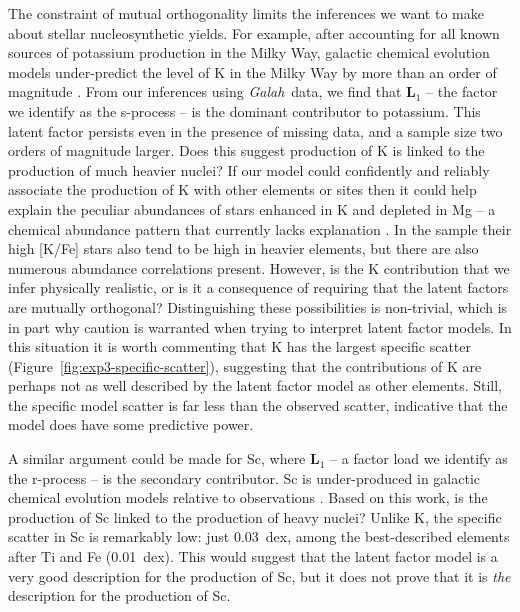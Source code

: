 \documentclass[twocolumn]{aastex62}
\newcommand{\project}[1]{\textsl{#1}}
\newcommand{\Galah}{\project{Galah}}
\newcommand{\factorloads}{\textbf{L}}
\begin{document}
The constraint of mutual orthogonality limits the inferences we want to make
about stellar nucleosynthetic yields. For example, after accounting for all
known sources of potassium production in the Milky Way, galactic chemical evolution
models under-predict the level of K in the Milky Way by more than an
order of magnitude \citep{Kobayashi:2006}. From our inferences 
using \Galah\ data, we find that $\factorloads_1$ -- the factor we identify as the s-process --  is the dominant contributor to
potassium. This latent factor persists even in the presence of missing data, and
a sample size two orders of magnitude larger.
Does this
suggest production of K is linked to the production of much heavier nuclei?
If our model could confidently and
reliably associate the production of K with other elements or sites then it could help explain the peculiar abundances of stars enhanced in
K and depleted in Mg \citep{Mucciarelli:2012,Cohen:2012} -- a chemical
abundance pattern that currently lacks explanation \citep{Iliadis:2016,Kemp:2018}.
In the \citep{Cohen:2012} sample their high [K/Fe] stars also tend
to be high in heavier elements, but there
are also numerous abundance correlations present.
However, is the K contribution that we infer physically realistic,
or is it a consequence of requiring that the latent factors are mutually
orthogonal? Distinguishing these possibilities is non-trivial, which is in
part why caution is warranted when trying to interpret latent factor models.
In this situation it is worth commenting that K has the largest specific
scatter (Figure~\ref{fig:exp3-specific-scatter}), suggesting that the contributions
of K are perhaps not as well described by the latent factor model as other
elements. Still, the specific model scatter is far less than the observed scatter,
indicative that the model does have some predictive power.


A similar argument could be made for Sc, where $\mathbf{L}_1$ -- a factor load we
identify as the r-process -- is the secondary contributor. Sc is under-produced in 
galactic chemical evolution models relative to observations \citep{Kobayashi:2006,Casey:2015}.
Based on this work, is the production of Sc linked to the production of heavy nuclei? 
Unlike K, the specific scatter in Sc is remarkably low: just 0.03~dex, among the
best-described elements after Ti and Fe (0.01~dex). This would suggest that the
latent factor model is a very good description for the production of Sc, but it
does not prove that it is \emph{the} description for the production of Sc.
\end{document}
